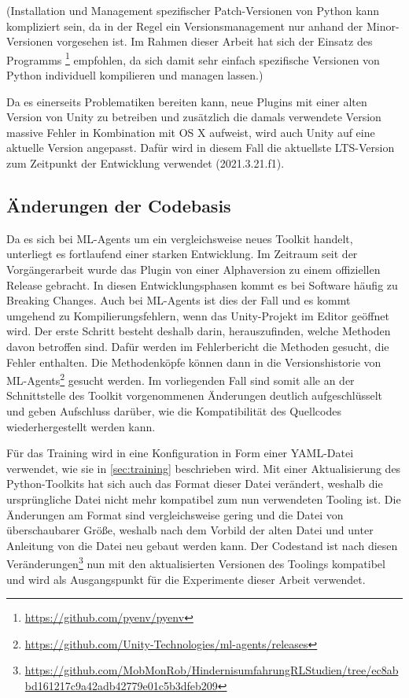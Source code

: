(Installation und Management spezifischer Patch-Versionen von Python kann kompliziert sein, da in der Regel ein Versionsmanagement nur anhand der Minor-Versionen vorgesehen ist.
Im Rahmen dieser Arbeit hat sich der Einsatz des Programms \footnote{\url{https://github.com/pyenv/pyenv}} empfohlen, da sich damit sehr einfach spezifische Versionen von Python individuell kompilieren und managen lassen.)

Da es einerseits Problematiken bereiten kann, neue Plugins mit einer alten Version von Unity zu betreiben und zusätzlich die damals verwendete Version massive Fehler in Kombination mit OS X aufweist, wird auch Unity auf eine aktuelle Version angepasst.
Dafür wird in diesem Fall die aktuellste LTS-Version zum Zeitpunkt der Entwicklung verwendet (2021.3.21.f1).

\subsection{Änderungen der Codebasis}
Da es sich bei ML-Agents um ein vergleichsweise neues Toolkit handelt, unterliegt es fortlaufend einer starken Entwicklung.
Im Zeitraum seit der Vorgängerarbeit wurde das Plugin von einer Alphaversion zu einem offiziellen Release gebracht.
In diesen Entwicklungsphasen kommt es bei Software häufig zu Breaking Changes.
Auch bei ML-Agents ist dies der Fall und es kommt umgehend zu Kompilierungsfehlern, wenn das Unity-Projekt im Editor geöffnet wird.
Der erste Schritt besteht deshalb darin, herauszufinden, welche Methoden davon betroffen sind.
Dafür werden im Fehlerbericht die Methoden gesucht, die Fehler enthalten.
Die Methodenköpfe können dann in die Versionshistorie von ML-Agents\footnote{\url{https://github.com/Unity-Technologies/ml-agents/releases}} gesucht werden.
Im vorliegenden Fall sind somit alle an der Schnittstelle des Toolkit vorgenommenen Änderungen deutlich aufgeschlüsselt und geben Aufschluss darüber, wie die Kompatibilität des Quellcodes wiederhergestellt werden kann.

Für das Training wird in \cite{waidner.2020} eine Konfiguration in Form einer YAML-Datei verwendet, wie sie in \autoref{sec:training} beschrieben wird.
Mit einer Aktualisierung des Python-Toolkits hat sich auch das Format dieser Datei verändert, weshalb die ursprüngliche Datei nicht mehr kompatibel zum nun verwendeten Tooling ist.
Die Änderungen am Format sind vergleichsweise gering und die Datei von überschaubarer Größe, weshalb nach dem Vorbild der alten Datei und unter Anleitung von \cite{mlagentsHyperparameter} die Datei neu gebaut werden kann.
Der Codestand ist nach diesen Veränderungen\footnote{\url{https://github.com/MobMonRob/HindernisumfahrungRLStudien/tree/ec8abbd161217c9a42adb42779e01c5b3dfeb209}} nun mit den aktualisierten Versionen des Toolings kompatibel und wird als Ausgangspunkt für die Experimente dieser Arbeit verwendet.

